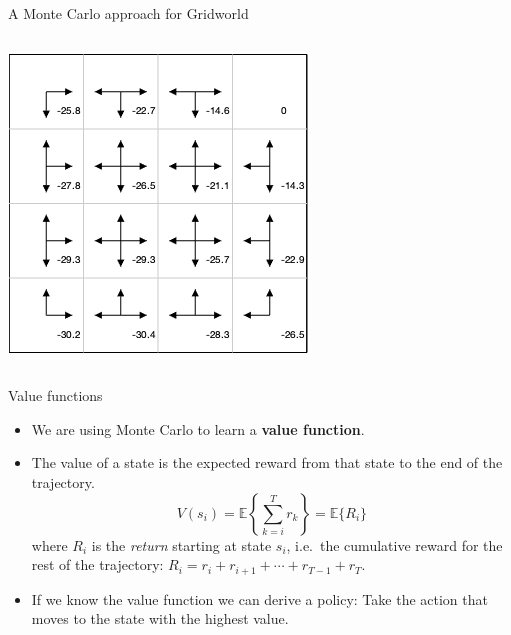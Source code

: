 \documentclass[9pt]{beamer}
\newcommand\lspace{\addtolength{\itemsep}{0.5\baselineskip}}
\begin{document}
\begin{frame}{A Monte Carlo approach for Gridworld}
\begin{columns}
\begin{column}{0.5\textwidth}
	\begin{center}
		\includegraphics[width=\textwidth]{figures/gridworld1a.png}	
	\end{center}
\end{column}

\end{columns}

\end{frame}

\begin{frame}{Value functions}

\begin{itemize}\lspace
	\item We are using Monte Carlo to learn a \textbf{value function}.
	\item The value of a state is the expected reward from that state to the end of the trajectory.
		\[ V(s_i) = \mathbb{E}\left\{ \sum_{k=i}^T r_k \right\} = \mathbb{E}\{R_i\} \]
	where $R_i$ is the \emph{return} starting at state $s_i$, i.e.\ the cumulative reward for the rest of the trajectory: $R_i = r_i + r_{i+1} + \cdots + r_{T-1} + r_T$.
	\item<2-> If we know the value function we can derive a policy: Take the action that moves to the state with the highest value.
\end{itemize}
	
\end{frame}
\end{document}
